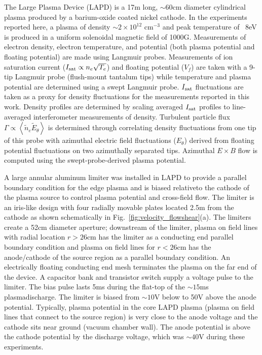 \documentclass[aip,pop,amsmath,amssymb,reprint,superscriptaddress]{revtex4-1} %
\begin{document}
The Large Plasma Device \cite{gek91} (LAPD) is a 17m long, $\sim$60cm diameter cylindrical plasma produced by a barium-oxide coated nickel cathode. In the experiments reported here, a plasma of density $\sim$$2 \times 10^{12}$ cm$^{-3}$ and peak temperature of ~8eV is produced in a uniform solenoidal magnetic field of 1000G.  Measurements of electron density, electron temperature, and potential (both plasma potential and floating potential) are made using Langmuir probes.   Measurements of ion saturation current ($I_{\rm sat} \propto n_e \sqrt{T_e}$) and floating potential ($V_f$) are taken with a 9-tip Langmuir probe (flush-mount tantalum tips) while temperature and plasma potential are determined using a swept Langmuir probe. $I_{\rm sat}$ fluctuations are taken as a proxy for density fluctuations for the measurements reported in this work. Density profiles are determined by scaling averaged $I_{\rm sat}$ profiles to line-averaged interferometer measurements of density.  Turbulent particle flux $\Gamma \propto \left<\tilde{n}_e \tilde{E}_\theta\right>$ is determined through correlating density fluctuations from one tip of this probe with azimuthal electric field fluctuations ($E_\theta$) derived from floating potential fluctuations on two azimuthally separated tips. Azimuthal $E\times B$ flow is computed using the swept-probe-derived plasma potential. 

A large annular aluminum limiter was installed in LAPD to provide a parallel boundary condition for the edge plasma and is biased relativeto the cathode of the plasma source to control plasma potential and cross-field flow.  The limiter is an iris-like design with four radially movable plates located 2.5m from the cathode as shown schematically in Fig.~\ref{fig:velocity_flowshear}(a).  The limiters create a 52cm diameter aperture; downstream of the limiter, plasma on field lines with radial location $r>26$cm has the limiter as a conducting end parallel boundary condition and plasma on field lines for $r<26$cm has the anode/cathode of the source region as a parallel boundary condition.  An electrically floating conducting end mesh terminates the plasma on the far end of the device.  A capacitor bank and transistor switch supply a voltage pulse to the limiter.  The bias pulse lasts 5ms during the flat-top of the $\sim$$15$ms plasmadischarge. The limiter is biased from $\sim$$10$V below to 50V above the anode potential.  Typically, plasma potential in the core LAPD plasma (plasma on field lines that connect to the source region) is very close to the anode voltage and the cathode sits near ground (vacuum chamber wall).  The anode potential is above the cathode potential by the discharge voltage, which was $\sim$$40$V during these experiments.
\end{document}
